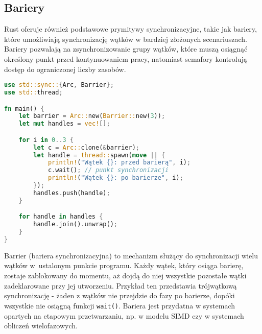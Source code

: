 \subsection{Bariery}
Rust oferuje również podstawowe prymitywy synchronizacyjne, takie jak bariery, które umożliwiają synchronizację wątków w bardziej złożonych scenariuszach. Bariery pozwalają na zsynchronizowanie grupy wątków, które muszą osiągnąć określony punkt przed kontynuowaniem pracy, natomiast semafory kontrolują dostęp do ograniczonej liczby zasobów.
\begin{lstlisting}[language=Rust, caption=Przykład użycia bariery, label=barrier_example]
use std::sync::{Arc, Barrier};
use std::thread;

fn main() {
    let barrier = Arc::new(Barrier::new(3));
    let mut handles = vec![];

    for i in 0..3 {
        let c = Arc::clone(&barrier);
        let handle = thread::spawn(move || {
            println!("Wątek {}: przed barierą", i);
            c.wait(); // punkt synchronizacji
            println!("Wątek {}: po barierze", i);
        });
        handles.push(handle);
    }

    for handle in handles {
        handle.join().unwrap();
    }
}
\end{lstlisting}
Barrier (bariera synchronizacyjna) to mechanizm służący do synchronizacji wielu wątków w~ustalonym punkcie programu. Każdy wątek, który osiąga barierę, zostaje zablokowany do momentu, aż dojdą do niej wszystkie pozostałe wątki zadeklarowane przy jej utworzeniu. Przykład ten przedstawia trójwątkową synchronizację - żaden z wątków nie przejdzie do fazy po barierze, dopóki wszystkie nie osiągną funkcji \texttt{wait()}. Bariera jest przydatna w systemach opartych na etapowym przetwarzaniu, np. w modelu SIMD czy w systemach obliczeń wielofazowych.